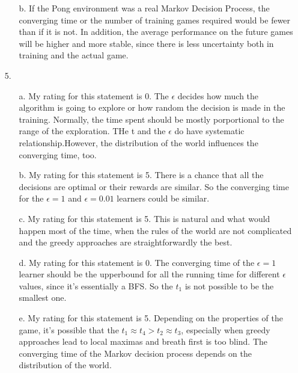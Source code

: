 \documentclass{article}
\begin{document}
\begin{titlepage}
\begin{enumerate}
\begin{enumerate}
   			\item[b.] If the Pong environment was a real Markov Decision Process, the converging time or the number of training games required would be fewer than if it is not. In addition, the average performance on the future games will be higher and more stable, since there is less uncertainty both in training and the actual game.
   		\end{enumerate}
   	\item[5.]
   		\begin{enumerate}
   			\item[a.] My rating for this statement is 0. The \(\epsilon\) decides how much the algorithm is going to explore or how random the decision is made in the training. Normally, the time spent should be mostly porportional to the range of the exploration. THe t and the \(\epsilon\) do have systematic relationship.However, the distribution of the world influences the converging time, too.
   			\item[b.] My rating for this statement is 5. There is a chance that all the decisions are optimal or their rewards are similar. So the converging time for the \(\epsilon=1\) and \(\epsilon=0.01\) learners could be similar.
   			\item[c.] My rating for this statement is 5. This is natural and what would happen most of the time, when the rules of the world are not complicated and the greedy approaches are straightforwardly the best.
   			\item[d.] My rating for this statement is 0. The converging time of the \(\epsilon=1\) learner should be the upperbound for all the running time for different \(\epsilon\) values, since it's essentially a BFS. So the \(t_1\) is not possible to be the smallest one.
   			\item[e.] My rating for this statement is 5. Depending on the properties of the game, it's possible that the \(t_1 \approx t_4 > t_2 \approx t_3\), especially when greedy approaches lead to local maximas and breath first is too blind. The converging time of the Markov decision process depends on the distribution of the world.
   		\end{enumerate}
   \end{enumerate}
\end{titlepage}
\end{document}
